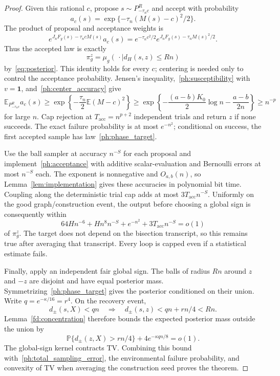 \documentclass[11pt]{article}
\def\P{\mathbb{P}}
\def\E{\mathbb{E}}
\numberwithin{equation}{section}
\begin{document}
\begin{proof}
Given this rational $c$, propose $s\sim P_{-\tau_nc}^R$ and accept with probability
\begin{equation}\label{ph:acceptance}
    a_c(s)=\exp\{-\tau_n(M(s)-c)^2/2\}.
\end{equation}
The product of proposal and acceptance weights is
\[
 e^{J_nF_g(s)-\tau_ncM(s)}a_c(s)
    =e^{-\tau_nc^2/2}e^{J_nF_g(s)-\tau_nM(s)^2/2}.
\]
Thus the accepted law is exactly
\begin{equation}\label{ph:phase_target}
    \pi_g^z=\mu_g(\,\cdot\mid d_H(s,z)\le Rn)
\end{equation}
by~\eqref{eq:posterior}. This identity holds for every $c$; centering is needed only to control the acceptance probability. Jensen's inequality,~\eqref{ph:susceptibility} with $v=\mathbf1$, and~\eqref{ph:center_accuracy} give
\[
 \E_{P_{-\tau_nc}^R}a_c(s)
 \ge\exp\left\{-\frac{\tau_n}{2}\E(M-c)^2\right\}
 \ge\exp\left\{-\frac{(a-b)K_0}{2}\log n-\frac{a-b}{2n}\right\}
 \ge n^{-p}
\]
for large $n$. Cap rejection at $T_{\mathrm{acc}}=n^{p+2}$ independent trials and return $z$ if none succeeds. The exact failure probability is at most $e^{-n^2}$; conditional on success, the first accepted sample has law~\eqref{ph:phase_target}.

Use the ball sampler at accuracy $n^{-S}$ for each proposal and implement~\eqref{ph:acceptance} with additive scalar-evaluation and Bernoulli errors at most $n^{-S}$ each. The exponent is nonnegative and $O_{a,b}(n)$, so Lemma~\ref{lem:implementation} gives these accuracies in polynomial bit time. Coupling along the deterministic trial cap adds at most $3T_{\mathrm{acc}}n^{-S}$. Uniformly on the good graph/construction event, the output before choosing a global sign is consequently within
\begin{equation}\label{ph:total_sampling_error}
    64Hn^{-6}+Hn^8n^{-S}+e^{-n^2}
             +3T_{\mathrm{acc}}n^{-S}=o(1)
\end{equation}
of $\pi_g^z$. The target does not depend on the bisection transcript, so this remains true after averaging that transcript. Every loop is capped even if a statistical estimate fails.

Finally, apply an independent fair global sign. The balls of radius $Rn$ around $z$ and $-z$ are disjoint and have equal posterior mass. Symmetrizing~\eqref{ph:phase_target} gives the posterior conditioned on their union. Write $q=e^{-\kappa/16}=r^4$. On the recovery event,
\[
 d_\pm(s,X)<qn
    \quad\Longrightarrow\quad
 d_\pm(s,z)<qn+rn/4<Rn.
\]
Lemma~\ref{fd:concentration} therefore bounds the expected posterior mass outside the union by
\[
    \P\{d_\pm(z,X)>rn/4\}+4e^{-\kappa qn/8}=o(1).
\]
The global-sign kernel contracts TV. Combining this bound with~\eqref{ph:total_sampling_error}, the environmental failure probability, and convexity of TV when averaging the construction seed proves the theorem.


\end{proof}
\end{document}
